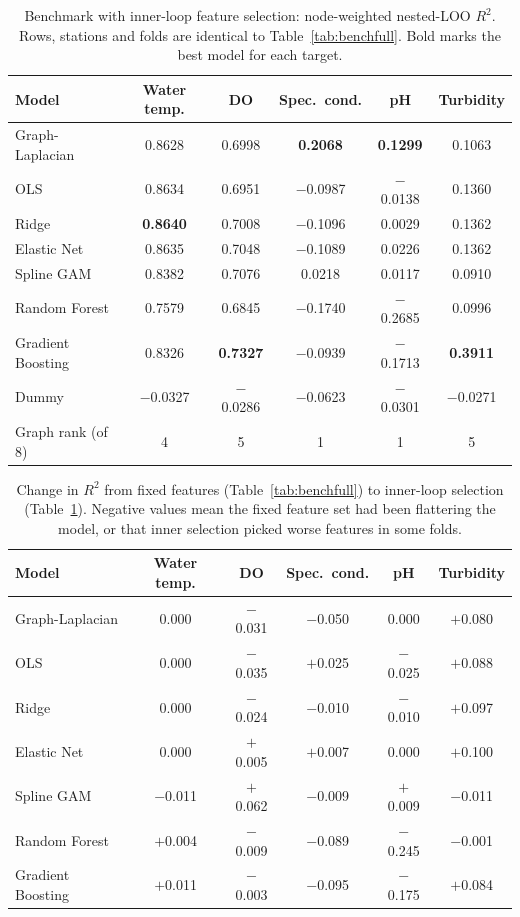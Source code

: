\documentclass[11pt]{article}
\begin{document}
\begin{table}[h]
\centering
\small
\caption{Benchmark with inner-loop feature selection: node-weighted nested-LOO $R^2$. Rows, stations
and folds are identical to Table~\ref{tab:benchfull}. Bold marks the best model for each target.}
\label{tab:benchinner}
\begin{tabular}{l c c c c c}
\toprule
Model & {Water temp.} & {DO} & {Spec.\ cond.} & {pH} & {Turbidity} \\
\midrule
Graph-Laplacian    & 0.8628 & 0.6998 & \textbf{0.2068} & \textbf{0.1299} & 0.1063 \\
OLS                & 0.8634 & 0.6951 & $-$0.0987 & $-$0.0138 & 0.1360 \\
Ridge              & \textbf{0.8640} & 0.7008 & $-$0.1096 & 0.0029 & 0.1362 \\
Elastic Net        & 0.8635 & 0.7048 & $-$0.1089 & 0.0226 & 0.1362 \\
Spline GAM         & 0.8382 & 0.7076 & 0.0218 & 0.0117 & 0.0910 \\
Random Forest      & 0.7579 & 0.6845 & $-$0.1740 & $-$0.2685 & 0.0996 \\
Gradient Boosting  & 0.8326 & \textbf{0.7327} & $-$0.0939 & $-$0.1713 & \textbf{0.3911} \\
Dummy              & $-$0.0327 & $-$0.0286 & $-$0.0623 & $-$0.0301 & $-$0.0271 \\
\midrule
Graph rank (of 8)  & 4 & 5 & 1 & 1 & 5 \\
\bottomrule
\end{tabular}
\end{table}

\begin{table}[h]
\centering
\small
\caption{Change in $R^2$ from fixed features (Table~\ref{tab:benchfull}) to inner-loop selection
(Table~\ref{tab:benchinner}). Negative values mean the fixed feature set had been flattering the
model, or that inner selection picked worse features in some folds.}
\label{tab:benchdelta}
\begin{tabular}{l c c c c c}
\toprule
Model & {Water temp.} & {DO} & {Spec.\ cond.} & {pH} & {Turbidity} \\
\midrule
Graph-Laplacian    & 0.000 & $-$0.031 & $-$0.050 & 0.000 & $+$0.080 \\
OLS                & 0.000 & $-$0.035 & $+$0.025 & $-$0.025 & $+$0.088 \\
Ridge              & 0.000 & $-$0.024 & $-$0.010 & $-$0.010 & $+$0.097 \\
Elastic Net        & 0.000 & $+$0.005 & $+$0.007 & 0.000 & $+$0.100 \\
Spline GAM         & $-$0.011 & $+$0.062 & $-$0.009 & $+$0.009 & $-$0.011 \\
Random Forest      & $+$0.004 & $-$0.009 & $-$0.089 & $-$0.245 & $-$0.001 \\
Gradient Boosting  & $+$0.011 & $-$0.003 & $-$0.095 & $-$0.175 & $+$0.084 \\
\bottomrule
\end{tabular}
\end{table}
\end{document}
